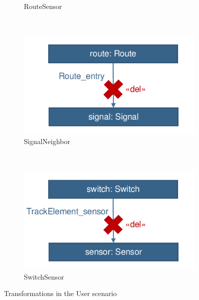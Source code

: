 \begin{figure}
\begin{subfigure}[b]{0.3\textwidth}
                \caption{\textsf{RouteSensor}}
                \label{fig:trainbenchmark-transformation-user-routesensor}
        \end{subfigure}%
        ~
        \begin{subfigure}[b]{0.3\textwidth}
                \includegraphics[width=\textwidth]{figures/trainbenchmark-transformation-user-signalneighbor}
                \caption{\textsf{SignalNeighbor}}
                \label{fig:trainbenchmark-transformation-user-signalneighbor}
        \end{subfigure}%
        ~
        \begin{subfigure}[b]{0.3\textwidth}
                \includegraphics[width=\textwidth]{figures/trainbenchmark-transformation-user-switchsensor}
                \caption{\textsf{SwitchSensor}}
                \label{fig:trainbenchmark-transformation-user-switchsensor}
        \end{subfigure}
        \caption{Transformations in the User scenario}\label{fig:trainbenchmark-transformations-xform}
\end{figure}


